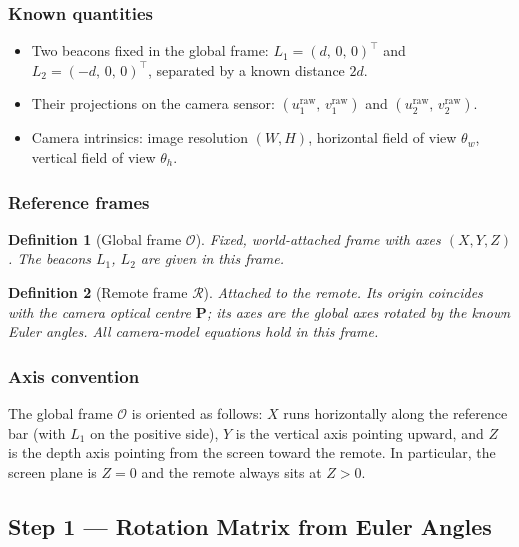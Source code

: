 \documentclass[12pt, a4paper]{article}
\newtheorem{definition}{Definition}
\begin{document}
\subsubsection{Known quantities}
\begin{itemize}[nosep]
    \item Two beacons fixed in the global frame:
          $L_1 = (d,\,0,\,0)^\top$ and $L_2 = (-d,\,0,\,0)^\top$,
          separated by a known distance $2d$.
    \item Their projections on the camera sensor:
          $(u_1^{\text{raw}},\, v_1^{\text{raw}})$ and
          $(u_2^{\text{raw}},\, v_2^{\text{raw}})$.
    \item Camera intrinsics: image resolution $(W, H)$, horizontal field of
          view $\theta_w$, vertical field of view $\theta_h$.
\end{itemize}

\subsubsection{Reference frames}
\begin{definition}[Global frame $\mathcal{O}$]
Fixed, world-attached frame with axes $(X, Y, Z)$.
The beacons $L_1$, $L_2$ are given in this frame.
\end{definition}
\begin{definition}[Remote frame $\mathcal{R}$]
Attached to the remote. Its origin coincides with the camera optical centre
$\mathbf{P}$; its axes are the global axes rotated by the known Euler angles.
All camera-model equations hold in this frame.
\end{definition}

\subsubsection{Axis convention}
The global frame $\mathcal{O}$ is oriented as follows: $X$ runs horizontally along the reference bar (with $L_1$ on the positive side), $Y$ is the vertical axis pointing upward, and $Z$ is the depth axis pointing from the screen toward the remote. In particular, the screen plane is $Z = 0$ and the remote always sits at $Z > 0$.

\subsection{Step 1 — Rotation Matrix from Euler Angles}
\end{document}
